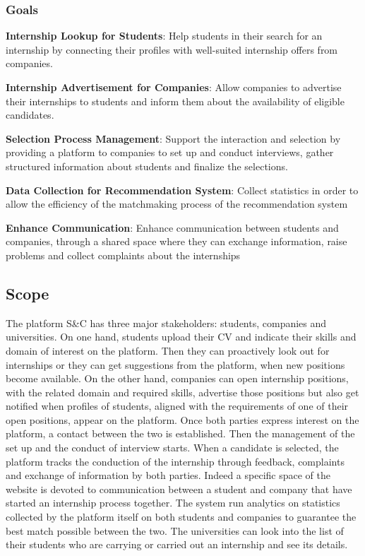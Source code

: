    \subsubsection{Goals}
        \begin{enumerate}[label={[G\arabic*]}]
            \item \textbf{Internship Lookup for Students}: 
                Help students in their search for an internship by connecting their profiles with well-suited internship offers from companies.
            \item \textbf{Internship Advertisement for Companies}: 
                Allow companies to advertise their internships to students and inform them about the availability of eligible candidates.
            \item \textbf{Selection Process Management}: 
                Support the interaction and selection by providing a platform to companies to set up and conduct interviews, gather structured information about students and finalize the selections.
            \item \textbf{Data Collection for Recommendation System}: 
                Collect statistics in order to allow the efficiency of the matchmaking process of the recommendation system 
            \item \textbf{Enhance Communication}: 
                Enhance communication between students and companies, through a shared space where they can exchange information, raise problems and collect complaints about the internships
        \end{enumerate}


\subsection{Scope}
    The platform S\&C has three major stakeholders: students, companies and universities. On one hand, students upload their CV and indicate their skills and domain of interest on the platform. Then they can proactively look out for internships or they can get suggestions from the platform, when new positions become available. On the other hand, companies can open internship positions, with the related domain and required skills, advertise those positions but also get notified when profiles of students, aligned with the requirements of one of their open positions, appear on the platform.
    Once both parties express interest on the platform, a contact between the two is established. Then the management of the set up and the conduct of interview starts. When a candidate is selected, the platform tracks the conduction of the internship through feedback, complaints and exchange of information by both parties. Indeed a specific space of the website is devoted to communication between a student and company that have started an internship process together. The system run analytics on statistics collected by the platform itself on both students and companies to guarantee the best match possible between the two.
    The universities can look into the list of their students who are carrying or carried out an internship and see its details.

